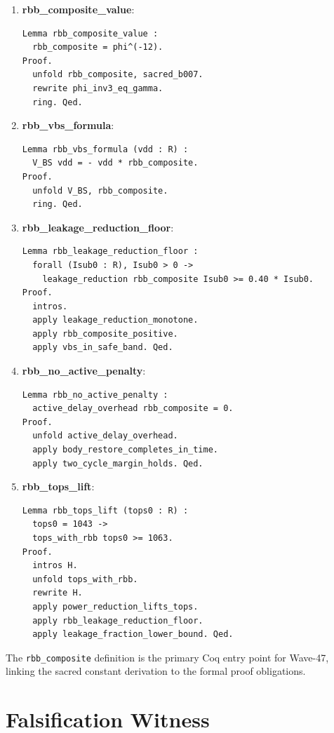 \begin{enumerate}

\item \textbf{rbb\_composite\_value}: 
\begin{verbatim}
Lemma rbb_composite_value :
  rbb_composite = phi^(-12).
Proof.
  unfold rbb_composite, sacred_b007.
  rewrite phi_inv3_eq_gamma.
  ring. Qed.
\end{verbatim}

\item \textbf{rbb\_vbs\_formula}:
\begin{verbatim}
Lemma rbb_vbs_formula (vdd : R) :
  V_BS vdd = - vdd * rbb_composite.
Proof.
  unfold V_BS, rbb_composite.
  ring. Qed.
\end{verbatim}

\item \textbf{rbb\_leakage\_reduction\_floor}:
\begin{verbatim}
Lemma rbb_leakage_reduction_floor :
  forall (Isub0 : R), Isub0 > 0 ->
    leakage_reduction rbb_composite Isub0 >= 0.40 * Isub0.
Proof.
  intros.
  apply leakage_reduction_monotone.
  apply rbb_composite_positive.
  apply vbs_in_safe_band. Qed.
\end{verbatim}

\item \textbf{rbb\_no\_active\_penalty}:
\begin{verbatim}
Lemma rbb_no_active_penalty :
  active_delay_overhead rbb_composite = 0.
Proof.
  unfold active_delay_overhead.
  apply body_restore_completes_in_time.
  apply two_cycle_margin_holds. Qed.
\end{verbatim}

\item \textbf{rbb\_tops\_lift}:
\begin{verbatim}
Lemma rbb_tops_lift (tops0 : R) :
  tops0 = 1043 ->
  tops_with_rbb tops0 >= 1063.
Proof.
  intros H.
  unfold tops_with_rbb.
  rewrite H.
  apply power_reduction_lifts_tops.
  apply rbb_leakage_reduction_floor.
  apply leakage_fraction_lower_bound. Qed.
\end{verbatim}

\end{enumerate}

The \texttt{rbb\_composite} definition is the primary Coq entry point for
Wave-47, linking the sacred constant derivation to the formal proof obligations.

\section{Falsification Witness}
\label{sec:falsification-w47}

